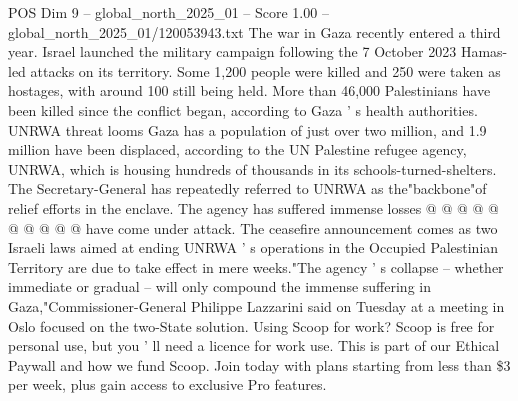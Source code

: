 \begin{textsample}{POS Dim 9 – global\_north\_2025\_01 – Score 1.00 – global\_north\_2025\_01/120053943.txt}
The war in Gaza recently entered a third year.
Israel launched the military campaign following the 7 October 2023 Hamas-led attacks on its territory.
Some 1,200 people were killed and 250 were taken as hostages, with around 100 still being held.
More than 46,000 Palestinians have been killed since the conflict began, according to Gaza ' s health authorities.
UNRWA threat looms Gaza has a population of just over two million, and 1.9 million have been displaced, according to the UN Palestine refugee agency, UNRWA, which is housing hundreds of thousands in its schools-turned-shelters.
The Secretary-General has repeatedly referred to UNRWA as the"backbone"of relief efforts in the enclave.
The agency has suffered immense losses @ @ @ @ @ @ @ @ @ @ have come under attack.
The ceasefire announcement comes as two Israeli laws aimed at ending UNRWA ' s operations in the Occupied Palestinian Territory are due to take effect in mere weeks."The agency ' s collapse -- whether immediate or gradual -- will only compound the immense suffering in Gaza,"Commissioner-General Philippe Lazzarini said on Tuesday at a meeting in Oslo focused on the two-State solution.
Using Scoop for work?
Scoop is free for personal use, but you ' ll need a licence for work use.
This is part of our Ethical Paywall and how we fund Scoop.
Join today with plans starting from less than \$3 per week, plus gain access to exclusive Pro features.

\end{textsample}
